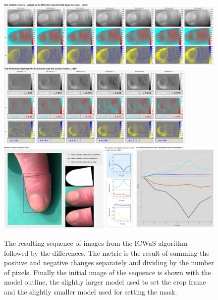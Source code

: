 \begin{figure}[h!]
  \centering
    \includegraphics[width=1.00\textwidth]{Chapter4/Figs/Final_Fig_Channels_JSkin.jpg}
    \includegraphics[width=0.86\textwidth]{Chapter4/Figs/Final_Fig_Total_Difference_JSkin.jpg}
    \includegraphics[width=1.00\textwidth]{Chapter4/Figs/Final_Fig_Misc_JSkin.jpg}
    \caption{The resulting sequence of images from the ICWaS algorithm followed by the differences. The metric is the result of summing the positive and negative changes separately and dividing by the number of pixels. Finally the initial image of the sequence is shown with the model outline, the slightly larger model used to set the crop frame and the slightly smaller model used for setting the mask.}\label{fig:ICWaSResultJSkin}
\end{figure}


